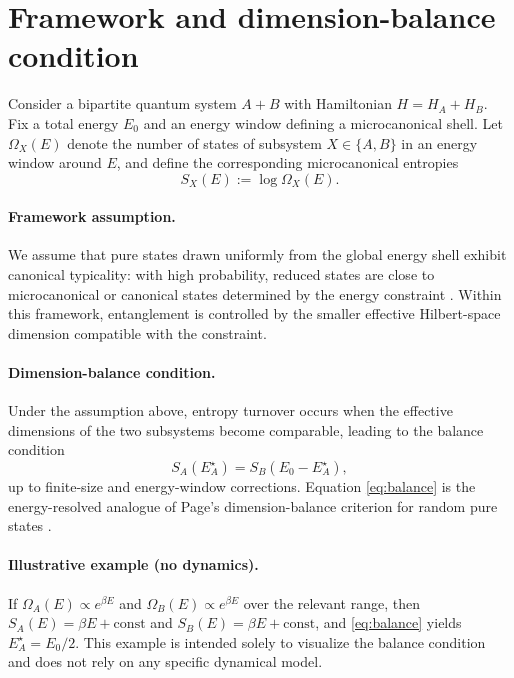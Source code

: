 \documentclass[11pt]{article}
\begin{document}
\section{Framework and dimension-balance condition}

Consider a bipartite quantum system $A+B$ with Hamiltonian $H=H_A+H_B$.
Fix a total energy $E_0$ and an energy window defining a microcanonical shell.
Let $\Omega_X(E)$ denote the number of states of subsystem $X\in\{A,B\}$ in an energy
window around $E$, and define the corresponding microcanonical entropies
\[
S_X(E) := \log \Omega_X(E).
\]

\paragraph{Framework assumption.}
We assume that pure states drawn uniformly from the global energy shell exhibit
canonical typicality: with high probability, reduced states are close to
microcanonical or canonical states determined by the energy constraint
\cite{PopescuShortWinter2006,Goldstein2006}.
Within this framework, entanglement is controlled by the smaller effective
Hilbert-space dimension compatible with the constraint.

\paragraph{Dimension-balance condition.}
Under the assumption above, entropy turnover occurs when the effective dimensions of
the two subsystems become comparable, leading to the balance condition
\begin{equation}
\label{eq:balance}
S_A(E_A^\star) = S_B(E_0 - E_A^\star),
\end{equation}
up to finite-size and energy-window corrections.
Equation \eqref{eq:balance} is the energy-resolved analogue of Page’s
dimension-balance criterion for random pure states \cite{Page1993}.

\paragraph{Illustrative example (no dynamics).}
If $\Omega_A(E)\propto e^{\beta E}$ and $\Omega_B(E)\propto e^{\beta E}$ over the
relevant range, then $S_A(E)=\beta E+\mathrm{const}$ and
$S_B(E)=\beta E+\mathrm{const}$, and \eqref{eq:balance} yields
$E_A^\star=E_0/2$.
This example is intended solely to visualize the balance condition and does not rely
on any specific dynamical model.
\end{document}

